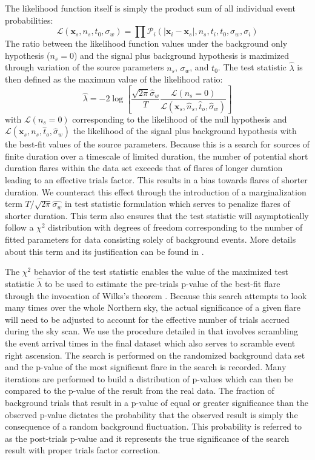 \documentclass[manuscript]{aastex}
\begin{document}
The likelihood function itself is simply the product sum of all individual event probabilities:
\begin{equation}\label{eq:LLH}
\mathcal{L}(\mathbf{x}_s,n_s,t_0,\sigma_w) = \prod \mathcal{P}_i(|\mathbf{x}_i-\mathbf{x}_s|,n_s,t_i,t_0,\sigma_w,\sigma_i)
\end{equation}
The ratio between the likelihood function values under the background only hypothesis ($n_s=0$) and the signal plus background hypothesis is maximized through variation of the source parameters $n_s$, $\sigma_w$, and $t_0$. The test statistic $\hat{\lambda}$ is then defined as the maximum value of the likelihood ratio:
\begin{equation}\label{eq:TS}
\hat{\lambda} = -2\log \left[\frac{\sqrt{2\pi}\hat{\sigma}_w}{T}\frac{\mathcal{L}(n_s = 0)}{\mathcal{L}(\mathbf{x}_s,\hat{n}_s,\hat{t}_o,\hat{\sigma}_w)} \right]
\end{equation}
with $\mathcal{L}(n_s = 0)$ corresponding to the likelihood of the null hypothesis and $\mathcal{L}(\mathbf{x}_s,{n}_s,\hat{t}_o,\hat{\sigma}_w)$ the likelihood of the signal plus background hypothesis with the best-fit values of the source parameters. Because this is a search for sources of finite duration over a timescale of limited duration, the number of potential short duration flares within the data set exceeds that of flares of longer duration leading to an effective trials factor. This results in a bias towards flares of shorter duration. We counteract this effect through the introduction of a marginalization term $T/\sqrt{2\pi}\hat{\sigma_w}$ in test statistic formulation which serves to penalize flares of shorter duration. This term also ensures that the test statistic will asymptotically follow a $\chi^2$ distribution with degrees of freedom corresponding to the number of fitted parameters for data consisting solely of background events. More details about this term and its justification can be found in \cite{2010APh....33..175B}.

The $\chi^2$ behavior of the test statistic enables the value of the maximized test statistic $\hat{\lambda}$ to be used to estimate the pre-trials p-value of the best-fit flare through the invocation of Wilks's theorem \citep{wilks1938}. Because this search attempts to look many times over the whole Northern sky, the actual significance of a given flare will need to be adjusted to account for the effective number of trials accrued during the sky scan. We use the procedure detailed in \cite{0004-637X-807-1-46} that involves scrambling the event arrival times in the final dataset which also serves to scramble event right ascension. The search is performed on the randomized background data set and the p-value of the most significant flare in the search is recorded. Many iterations are performed to build a distribution of p-values which can then be compared to the p-value of the result from the real data. The fraction of background trials that result in a p-value of equal or greater significance than the observed p-value dictates the probability that the observed result is simply the consequence of a random background fluctuation. This probability is referred to as the post-trials p-value and it represents the true significance of the search result with proper trials factor correction.
\end{document}
